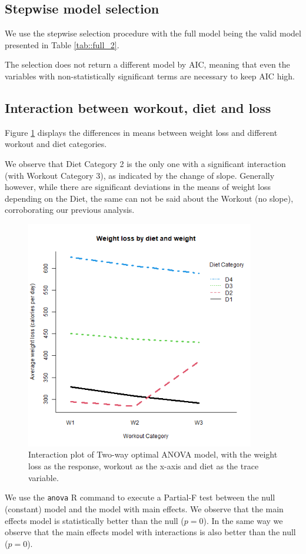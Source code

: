 \documentclass[12pt, a4paper]{article}
\def\code#1{\texttt{#1}}
\begin{document}
		
		
	\subsection{Stepwise model selection}
	
	We use the stepwise selection procedure with the full model being the valid model presented in Table \ref{tab::full_2}.
	
	The selection does not return a different model by AIC, meaning that even the variables with non-statistically significant terms are necessary to keep AIC high.
	
	
	\subsection{Interaction between workout, diet and loss }
	
	Figure \ref{fig::interaction_2} displays the differences in means between weight loss and different workout and diet categories.
	
	We observe that Diet Category 2 is the only one with a significant interaction (with Workout Category 3), as indicated by the change of slope. Generally however, while there are significant deviations in the means of weight loss depending on the Diet, the same can not be said about the Workout (no slope), corroborating our previous analysis.
	
	\begin{figure}
		\includegraphics[width=10cm]{interaction_2.png}
		\centering
		\caption{Interaction plot of Two-way optimal ANOVA model, with the weight loss as the response, workout as the x-axis and diet as the trace variable.}
		\label{fig::interaction_2}
	\end{figure}
	
	We use the \code{anova} R command to execute a Partial-F test between the null (constant) model and the model with main effects. We observe that the main effects model is statistically better than the null ($p=0$). In the same way we observe that the main effects model with interactions is also better than the null ($p=0$).
	
	\printbibliography
\end{document}

